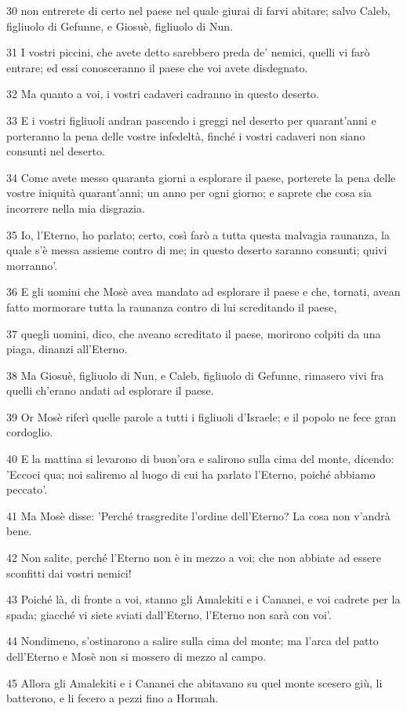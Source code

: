 \par 30 non entrerete di certo nel paese nel quale giurai di farvi abitare; salvo Caleb, figliuolo di Gefunne, e Giosuè, figliuolo di Nun.
\par 31 I vostri piccini, che avete detto sarebbero preda de' nemici, quelli vi farò entrare; ed essi conosceranno il paese che voi avete disdegnato.
\par 32 Ma quanto a voi, i vostri cadaveri cadranno in questo deserto.
\par 33 E i vostri figliuoli andran pascendo i greggi nel deserto per quarant'anni e porteranno la pena delle vostre infedeltà, finché i vostri cadaveri non siano consunti nel deserto.
\par 34 Come avete messo quaranta giorni a esplorare il paese, porterete la pena delle vostre iniquità quarant'anni; un anno per ogni giorno; e saprete che cosa sia incorrere nella mia disgrazia.
\par 35 Io, l'Eterno, ho parlato; certo, così farò a tutta questa malvagia raunanza, la quale s'è messa assieme contro di me; in questo deserto saranno consunti; quivi morranno'.
\par 36 E gli uomini che Mosè avea mandato ad esplorare il paese e che, tornati, avean fatto mormorare tutta la raunanza contro di lui screditando il paese,
\par 37 quegli uomini, dico, che aveano screditato il paese, morirono colpiti da una piaga, dinanzi all'Eterno.
\par 38 Ma Giosuè, figliuolo di Nun, e Caleb, figliuolo di Gefunne, rimasero vivi fra quelli ch'erano andati ad esplorare il paese.
\par 39 Or Mosè riferì quelle parole a tutti i figliuoli d'Israele; e il popolo ne fece gran cordoglio.
\par 40 E la mattina si levarono di buon'ora e salirono sulla cima del monte, dicendo: 'Eccoci qua; noi saliremo al luogo di cui ha parlato l'Eterno, poiché abbiamo peccato'.
\par 41 Ma Mosè disse: 'Perché trasgredite l'ordine dell'Eterno? La cosa non v'andrà bene.
\par 42 Non salite, perché l'Eterno non è in mezzo a voi; che non abbiate ad essere sconfitti dai vostri nemici!
\par 43 Poiché là, di fronte a voi, stanno gli Amalekiti e i Cananei, e voi cadrete per la spada; giacché vi siete sviati dall'Eterno, l'Eterno non sarà con voi'.
\par 44 Nondimeno, s'ostinarono a salire sulla cima del monte; ma l'arca del patto dell'Eterno e Mosè non si mossero di mezzo al campo.
\par 45 Allora gli Amalekiti e i Cananei che abitavano su quel monte scesero giù, li batterono, e li fecero a pezzi fino a Hormah.

